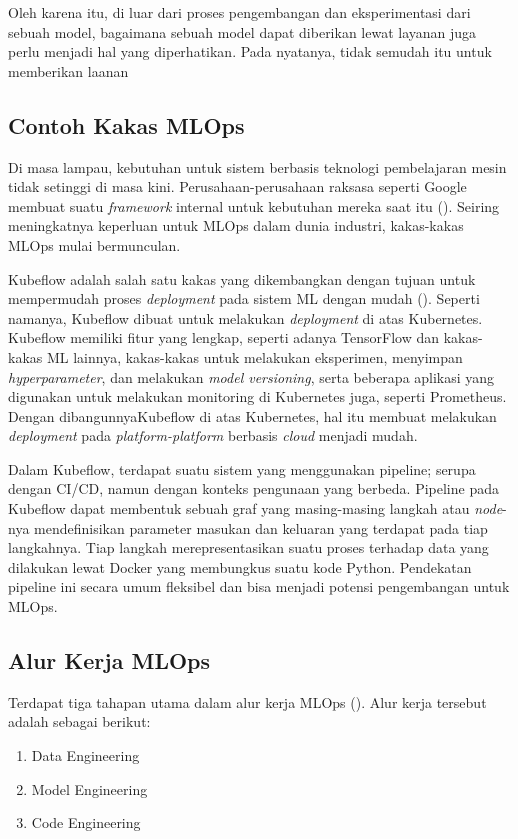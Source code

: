 Oleh karena itu, di luar dari proses pengembangan dan eksperimentasi dari sebuah model, bagaimana sebuah model dapat diberikan lewat layanan juga perlu menjadi hal yang diperhatikan.
Pada nyatanya, tidak semudah itu untuk memberikan laanan


\subsection{Contoh Kakas MLOps}

Di masa lampau, kebutuhan untuk sistem berbasis teknologi pembelajaran mesin tidak setinggi di masa kini. 
Perusahaan-perusahaan raksasa seperti Google membuat suatu \textit{framework} internal untuk kebutuhan mereka saat itu (\cite{mlops}).
Seiring meningkatnya keperluan untuk MLOps dalam dunia industri, kakas-kakas MLOps mulai bermunculan.

Kubeflow adalah salah satu kakas yang dikembangkan dengan tujuan untuk mempermudah proses \textit{deployment} pada sistem ML dengan mudah (\cite{k8s}).
Seperti namanya, Kubeflow dibuat untuk melakukan \textit{deployment} di atas Kubernetes.
Kubeflow memiliki fitur yang lengkap, seperti adanya TensorFlow dan kakas-kakas ML lainnya, kakas-kakas untuk melakukan eksperimen, menyimpan \textit{hyperparameter}, dan melakukan \textit{model versioning}, serta beberapa aplikasi yang digunakan untuk melakukan monitoring di Kubernetes juga, seperti Prometheus.
Dengan dibangunnyaKubeflow di atas Kubernetes, hal itu membuat melakukan \textit{deployment} pada \textit{platform-platform} berbasis \textit{cloud} menjadi mudah.

Dalam Kubeflow, terdapat suatu sistem yang menggunakan pipeline; serupa dengan CI/CD, namun dengan konteks pengunaan yang berbeda.
Pipeline pada Kubeflow dapat membentuk sebuah graf yang masing-masing langkah atau \textit{node}-nya mendefinisikan parameter masukan dan keluaran yang terdapat pada tiap langkahnya.
Tiap langkah merepresentasikan suatu proses terhadap data yang dilakukan lewat Docker yang membungkus suatu kode Python.
Pendekatan pipeline ini secara umum fleksibel dan bisa menjadi potensi pengembangan untuk MLOps.

\subsection{Alur Kerja MLOps}

Terdapat tiga tahapan utama dalam alur kerja MLOps (\cite{mlopsorg}).
Alur kerja tersebut adalah sebagai berikut:
\begin{enumerate}
  \item Data Engineering
  \item Model Engineering
  \item Code Engineering
\end{enumerate}

